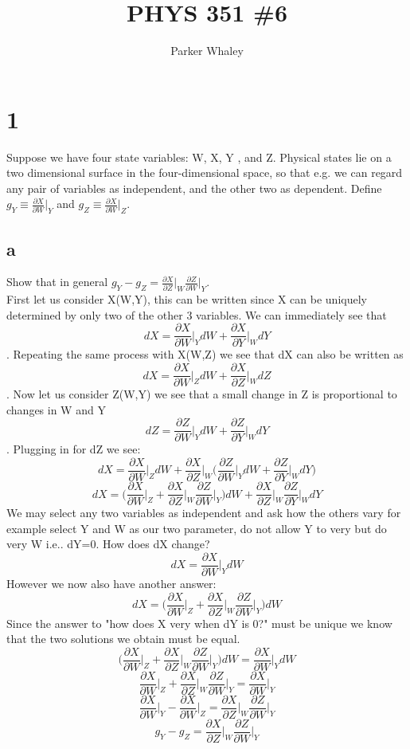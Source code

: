 \documentclass[10pt,a4paper]{article}
\author{Parker Whaley}
\title{PHYS 351 \#6}
\begin{document}
\maketitle
\section{1}
Suppose we have four state variables: W, X, Y , and Z. Physical states lie on a two dimensional surface in the four-dimensional space, so that e.g. we can regard any pair of variables as independent, and the other two as dependent. Define $g_Y\equiv \frac{\partial X}{\partial W}\biggr |_Y $ and $g_Z\equiv \frac{\partial X}{\partial W}\biggr |_Z$.
\subsection{a}
Show that in general $g_Y-g_Z=\frac{\partial X}{\partial Z}\biggr |_W \frac{\partial Z}{\partial W}\biggr |_Y$.\\

First let us consider X(W,Y), this can be written since X can be uniquely determined by only two of the other 3 variables.  We can immediately see that $$dX=\frac{\partial X}{\partial W}\biggr |_Y dW+\frac{\partial X}{\partial Y}\biggr |_W dY$$.  Repeating the same process with X(W,Z) we see that dX can also be written as $$dX=\frac{\partial X}{\partial W}\biggr |_Z dW+\frac{\partial X}{\partial Z}\biggr |_W dZ$$.  Now let us consider Z(W,Y) we see that a small change in Z is proportional to changes in W and Y $$dZ=\frac{\partial Z}{\partial W}\biggr |_Y dW+\frac{\partial Z}{\partial Y}\biggr |_W dY$$.  Plugging in for dZ we see: $$dX=\frac{\partial X}{\partial W}\biggr |_Z dW+\frac{\partial X}{\partial Z}\biggr |_W \biggr (\frac{\partial Z}{\partial W}\biggr |_Y dW+\frac{\partial Z}{\partial Y}\biggr |_W dY\biggr )$$
$$dX=\biggr (\frac{\partial X}{\partial W}\biggr |_Z+\frac{\partial X}{\partial Z}\biggr |_W \frac{\partial Z}{\partial W}\biggr |_Y\biggr ) dW+\frac{\partial X}{\partial Z}\biggr |_W \frac{\partial Z}{\partial Y}\biggr |_W dY$$
We may select any two variables as independent and ask how the others vary for example select Y and W as our two parameter, do not allow Y to very but do very W i.e.. dY=0.  How does dX change?
$$dX=\frac{\partial X}{\partial W}\biggr |_Y dW$$
However we now also have another answer:
$$dX=\biggr (\frac{\partial X}{\partial W}\biggr |_Z+\frac{\partial X}{\partial Z}\biggr |_W \frac{\partial Z}{\partial W}\biggr |_Y\biggr ) dW$$
Since the answer to "how does X very when dY is 0?" must be unique we know that the two solutions we obtain must be equal.
$$\biggr (\frac{\partial X}{\partial W}\biggr |_Z+\frac{\partial X}{\partial Z}\biggr |_W \frac{\partial Z}{\partial W}\biggr |_Y\biggr ) dW=\frac{\partial X}{\partial W}\biggr |_Y dW$$
$$\frac{\partial X}{\partial W}\biggr |_Z+\frac{\partial X}{\partial Z}\biggr |_W \frac{\partial Z}{\partial W}\biggr |_Y=\frac{\partial X}{\partial W}\biggr |_Y$$
$$\frac{\partial X}{\partial W}\biggr |_Y-\frac{\partial X}{\partial W}\biggr |_Z=\frac{\partial X}{\partial Z}\biggr |_W \frac{\partial Z}{\partial W}\biggr |_Y$$
$$g_Y-g_Z=\frac{\partial X}{\partial Z}\biggr |_W \frac{\partial Z}{\partial W}\biggr |_Y$$
\end{document}

